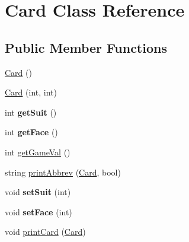 \hypertarget{class_card}{\section{Card Class Reference}
\label{class_card}
}
\subsection*{Public Member Functions}
\begin{DoxyCompactItemize}
\item 
\hyperlink{class_card_a783f5854cbe8c183ee3d4414c01472c0}{Card} ()
\item 
\hyperlink{class_card_aad945a195000dceb03adfa9980c846ad}{Card} (int, int)
\item 
\hypertarget{class_card_ad82a99d71c4659f9ff66a716151ef910}{int {\bfseries get\+Suit} ()}\label{class_card_ad82a99d71c4659f9ff66a716151ef910}

\item 
\hypertarget{class_card_a8538ea5ba2f7e9889719f6bad587a22a}{int {\bfseries get\+Face} ()}\label{class_card_a8538ea5ba2f7e9889719f6bad587a22a}

\item 
int \hyperlink{class_card_af5dac040b788a9630d9e72ad490dcd26}{get\+Game\+Val} ()
\item 
string \hyperlink{class_card_a0c7b8b3624b37a1c347745a90e985965}{print\+Abbrev} (\hyperlink{class_card}{Card}, bool)
\item 
\hypertarget{class_card_a6ccd6088377ab1171aa647f987eeeaaf}{void {\bfseries set\+Suit} (int)}\label{class_card_a6ccd6088377ab1171aa647f987eeeaaf}

\item 
\hypertarget{class_card_a9cb8f841e5c6a981336d1814b6569a12}{void {\bfseries set\+Face} (int)}\label{class_card_a9cb8f841e5c6a981336d1814b6569a12}

\item 
void \hyperlink{class_card_a5fdb67ed250c91dfdec6cfff67d95648}{print\+Card} (\hyperlink{class_card}{Card})
\end{DoxyCompactItemize}


